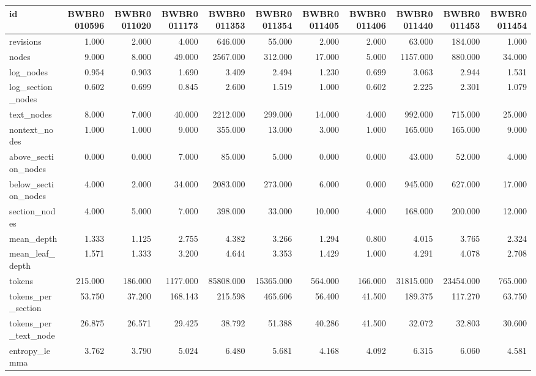 \begin{tabular}{lrrrrrrrrrr}
\toprule
id & BWBR0010596 & BWBR0011020 & BWBR0011173 & BWBR0011353 & BWBR0011354 & BWBR0011405 & BWBR0011406 & BWBR0011440 & BWBR0011453 & BWBR0011454 \\
\midrule
revisions & 1.000 & 2.000 & 4.000 & 646.000 & 55.000 & 2.000 & 2.000 & 63.000 & 184.000 & 1.000 \\
\cline{1-11}
nodes & 9.000 & 8.000 & 49.000 & 2567.000 & 312.000 & 17.000 & 5.000 & 1157.000 & 880.000 & 34.000 \\
\cline{1-11}
log\_nodes & 0.954 & 0.903 & 1.690 & 3.409 & 2.494 & 1.230 & 0.699 & 3.063 & 2.944 & 1.531 \\
\cline{1-11}
log\_section\_nodes & 0.602 & 0.699 & 0.845 & 2.600 & 1.519 & 1.000 & 0.602 & 2.225 & 2.301 & 1.079 \\
\cline{1-11}
text\_nodes & 8.000 & 7.000 & 40.000 & 2212.000 & 299.000 & 14.000 & 4.000 & 992.000 & 715.000 & 25.000 \\
\cline{1-11}
nontext\_nodes & 1.000 & 1.000 & 9.000 & 355.000 & 13.000 & 3.000 & 1.000 & 165.000 & 165.000 & 9.000 \\
\cline{1-11}
above\_section\_nodes & 0.000 & 0.000 & 7.000 & 85.000 & 5.000 & 0.000 & 0.000 & 43.000 & 52.000 & 4.000 \\
\cline{1-11}
below\_section\_nodes & 4.000 & 2.000 & 34.000 & 2083.000 & 273.000 & 6.000 & 0.000 & 945.000 & 627.000 & 17.000 \\
\cline{1-11}
section\_nodes & 4.000 & 5.000 & 7.000 & 398.000 & 33.000 & 10.000 & 4.000 & 168.000 & 200.000 & 12.000 \\
\cline{1-11}
mean\_depth & 1.333 & 1.125 & 2.755 & 4.382 & 3.266 & 1.294 & 0.800 & 4.015 & 3.765 & 2.324 \\
\cline{1-11}
mean\_leaf\_depth & 1.571 & 1.333 & 3.200 & 4.644 & 3.353 & 1.429 & 1.000 & 4.291 & 4.078 & 2.708 \\
\cline{1-11}
tokens & 215.000 & 186.000 & 1177.000 & 85808.000 & 15365.000 & 564.000 & 166.000 & 31815.000 & 23454.000 & 765.000 \\
\cline{1-11}
tokens\_per\_section & 53.750 & 37.200 & 168.143 & 215.598 & 465.606 & 56.400 & 41.500 & 189.375 & 117.270 & 63.750 \\
\cline{1-11}
tokens\_per\_text\_node & 26.875 & 26.571 & 29.425 & 38.792 & 51.388 & 40.286 & 41.500 & 32.072 & 32.803 & 30.600 \\
\cline{1-11}
entropy\_lemma & 3.762 & 3.790 & 5.024 & 6.480 & 5.681 & 4.168 & 4.092 & 6.315 & 6.060 & 4.581 \\

\end{tabular}
